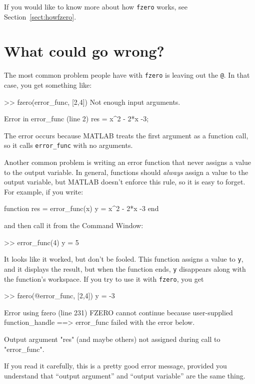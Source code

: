 \documentclass[
]{book}
\numberwithin{Answer}{chapter}
\numberwithin{Exercise}{chapter}
\begin{document}
If you would like to know more about how {\tt fzero} works, see Section~\ref{sect:howfzero}.


\section{What could go wrong?}

The most common problem people have with {\tt fzero} is leaving
out the {\tt @}.  In that case, you get something like:

\begin{code}
>> fzero(error_func, [2,4])
Not enough input arguments.

Error in error_func (line 2)
    res = x^2 - 2*x -3;
\end{code}

The error occurs because MATLAB treats the first argument as a function call,
so it calls {\tt error\_func} with no arguments.

Another common problem is writing an error function that never
assigns a value to the output variable.  In general, functions should
{\em always} assign a value to the output variable, but MATLAB doesn't
enforce this rule, so it is easy to forget.  For example, if you
write:

\begin{code}
function res = error_func(x)
    y = x^2 - 2*x -3
end
\end{code}

and then call it from the {\sf Command Window}:

\begin{code}
>> error_func(4)
y = 5
\end{code}

It looks like it worked, but don't be fooled.  This function assigns
a value to {\tt y}, and it displays the result, but when the function
ends, {\tt y} disappears along with the function's workspace.
If you try to use it with {\tt fzero}, you get

\begin{code}
>> fzero(@error_func, [2,4])
y = -3

Error using fzero (line 231)
FZERO cannot continue because user-supplied function_handle ==>
error_func failed with the error below.

Output argument "res" (and maybe others) not assigned during call
to "error_func".
\end{code}

If you read it carefully, this is a pretty good error message,
provided you understand that ``output argument'' and ``output variable'' are the same thing.
\end{document}
